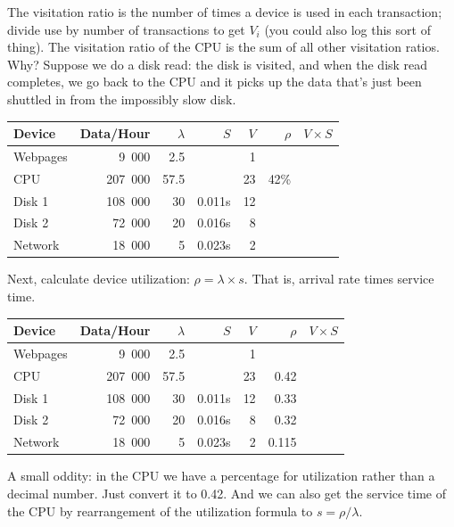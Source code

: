 The visitation ratio is the number of times a device is used in each transaction; divide use by number of transactions to get $V_{i}$ (you could also log this sort of thing). The visitation ratio of the CPU is the sum of all other visitation ratios. Why? Suppose we do a disk read: the disk is visited, and when the disk read completes, we go back to the CPU and it picks up the data that's just been shuttled in from the impossibly slow disk.

\begin{center}
\begin{tabular}{l|r|r|r|r|r|r} 
	\textbf{Device} & \textbf{Data/Hour} & \textbf{$\lambda$} & \textbf{$S$} & \textbf{$V$} & \textbf{$\rho$} & \textbf{$V \times S$} \\ \hline
	Webpages & 9~000 & 2.5 & & 1 & & \\ \hline
	CPU & 207~000 & 57.5 &  & 23 & 42\% & \\ \hline
	Disk 1 & 108~000 & 30 & 0.011s  & 12& &\\ \hline
	Disk 2 & 72~000 & 20 & 0.016s & 8 & &\\ \hline
	Network & 18~000 & 5 & 0.023s & 2 & &
\end{tabular}
\end{center}

Next, calculate device utilization: $\rho = \lambda \times s$. That is, arrival rate times service time.

\begin{center}
\begin{tabular}{l|r|r|r|r|r|r} 
	\textbf{Device} & \textbf{Data/Hour} & \textbf{$\lambda$} & \textbf{$S$} & \textbf{$V$} & \textbf{$\rho$} & \textbf{$V \times S$} \\ \hline
	Webpages & 9~000 & 2.5 & & 1 & & \\ \hline
	CPU & 207~000 & 57.5 &  & 23 & 0.42 & \\ \hline
	Disk 1 & 108~000 & 30 & 0.011s  & 12& 0.33 &\\ \hline
	Disk 2 & 72~000 & 20 & 0.016s & 8 & 0.32 &\\ \hline
	Network & 18~000 & 5 & 0.023s & 2 & 0.115 &
\end{tabular}
\end{center}

A small oddity: in the CPU we have a percentage for utilization rather than a decimal number. Just convert it to 0.42. And we can also get the service time of the CPU by rearrangement of the utilization formula to $s = \rho / \lambda$.

